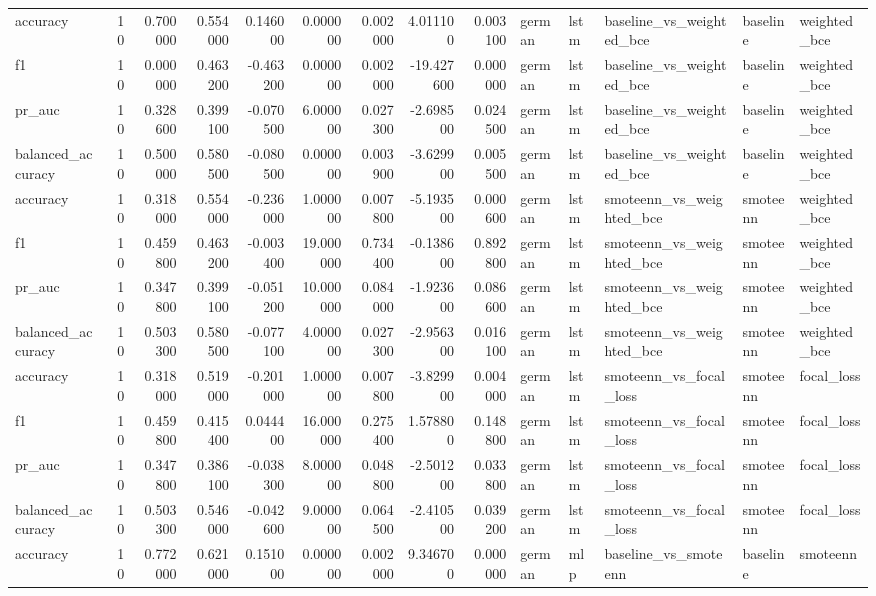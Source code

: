 \begin{tabular}{lrrrrrrrrlllll}
accuracy & 10 & 0.700000 & 0.554000 & 0.146000 & 0.000000 & 0.002000 & 4.011100 & 0.003100 & german & lstm & baseline_vs_weighted_bce & baseline & weighted_bce \\
f1 & 10 & 0.000000 & 0.463200 & -0.463200 & 0.000000 & 0.002000 & -19.427600 & 0.000000 & german & lstm & baseline_vs_weighted_bce & baseline & weighted_bce \\
pr_auc & 10 & 0.328600 & 0.399100 & -0.070500 & 6.000000 & 0.027300 & -2.698500 & 0.024500 & german & lstm & baseline_vs_weighted_bce & baseline & weighted_bce \\
balanced_accuracy & 10 & 0.500000 & 0.580500 & -0.080500 & 0.000000 & 0.003900 & -3.629900 & 0.005500 & german & lstm & baseline_vs_weighted_bce & baseline & weighted_bce \\
accuracy & 10 & 0.318000 & 0.554000 & -0.236000 & 1.000000 & 0.007800 & -5.193500 & 0.000600 & german & lstm & smoteenn_vs_weighted_bce & smoteenn & weighted_bce \\
f1 & 10 & 0.459800 & 0.463200 & -0.003400 & 19.000000 & 0.734400 & -0.138600 & 0.892800 & german & lstm & smoteenn_vs_weighted_bce & smoteenn & weighted_bce \\
pr_auc & 10 & 0.347800 & 0.399100 & -0.051200 & 10.000000 & 0.084000 & -1.923600 & 0.086600 & german & lstm & smoteenn_vs_weighted_bce & smoteenn & weighted_bce \\
balanced_accuracy & 10 & 0.503300 & 0.580500 & -0.077100 & 4.000000 & 0.027300 & -2.956300 & 0.016100 & german & lstm & smoteenn_vs_weighted_bce & smoteenn & weighted_bce \\
accuracy & 10 & 0.318000 & 0.519000 & -0.201000 & 1.000000 & 0.007800 & -3.829900 & 0.004000 & german & lstm & smoteenn_vs_focal_loss & smoteenn & focal_loss \\
f1 & 10 & 0.459800 & 0.415400 & 0.044400 & 16.000000 & 0.275400 & 1.578800 & 0.148800 & german & lstm & smoteenn_vs_focal_loss & smoteenn & focal_loss \\
pr_auc & 10 & 0.347800 & 0.386100 & -0.038300 & 8.000000 & 0.048800 & -2.501200 & 0.033800 & german & lstm & smoteenn_vs_focal_loss & smoteenn & focal_loss \\
balanced_accuracy & 10 & 0.503300 & 0.546000 & -0.042600 & 9.000000 & 0.064500 & -2.410500 & 0.039200 & german & lstm & smoteenn_vs_focal_loss & smoteenn & focal_loss \\
accuracy & 10 & 0.772000 & 0.621000 & 0.151000 & 0.000000 & 0.002000 & 9.346700 & 0.000000 & german & mlp & baseline_vs_smoteenn & baseline & smoteenn \\

\end{tabular}
